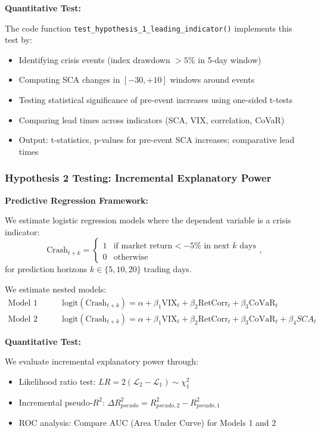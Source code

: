 \documentclass[preprint,12pt,authoryear]{elsarticle}
\begin{document}
\noindent
\textbf{Quantitative Test:}

The code function \texttt{test\_hypothesis\_1\_leading\_indicator()} implements this test by:
\begin{itemize}
\item Identifying crisis events (index drawdown $>5\%$ in 5-day window)
\item Computing SCA changes in $[-30, +10]$ windows around events
\item Testing statistical significance of pre-event increases using one-sided t-tests
\item Comparing lead times across indicators (SCA, VIX, correlation, CoVaR)
\item Output: t-statistics, p-values for pre-event SCA increases; comparative lead times
\end{itemize}

\subsubsection{Hypothesis 2 Testing: Incremental Explanatory Power}

\noindent
\textbf{Predictive Regression Framework:}

We estimate logistic regression models where the dependent variable is a crisis indicator:
\begin{equation}
\text{Crash}_{t+k} = \begin{cases}
1 & \text{if market return} < -5\% \text{ in next } k \text{ days} \\
0 & \text{otherwise}
\end{cases},
\end{equation}
for prediction horizons $k \in \{5, 10, 20\}$ trading days.

We estimate nested models:
\begin{align}
\text{Model 1 (Baseline):} \quad & \text{logit}(\text{Crash}_{t+k}) = \alpha + \beta_1 \text{VIX}_t + \beta_2 \text{RetCorr}_t + \beta_3 \text{CoVaR}_t \\
\text{Model 2 (SCA Added):} \quad & \text{logit}(\text{Crash}_{t+k}) = \alpha + \beta_1 \text{VIX}_t + \beta_2 \text{RetCorr}_t + \beta_3 \text{CoVaR}_t + \beta_4 SCA_t
\end{align}

\noindent
\textbf{Quantitative Test:}

We evaluate incremental explanatory power through:
\begin{itemize}
\item Likelihood ratio test: $LR = 2(\mathcal{L}_2 - \mathcal{L}_1) \sim \chi^2_1$
\item Incremental pseudo-$R^2$: $\Delta R^2_{pseudo} = R^2_{pseudo,2} - R^2_{pseudo,1}$
\item ROC analysis: Compare AUC (Area Under Curve) for Models 1 and 2
\end{itemize}
\end{document}
